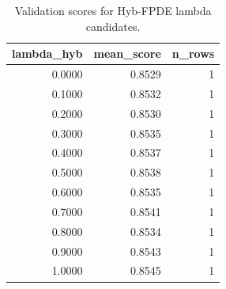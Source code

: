 \begin{table}[t]
\caption{Validation scores for Hyb-FPDE lambda candidates.}
\label{tab:lambda_distribution_computed}
\centering
\begin{tabular}{rrr}
\toprule
lambda\_hyb & mean\_score & n\_rows \\
\midrule
0.0000 & 0.8529 & 1 \\
0.1000 & 0.8532 & 1 \\
0.2000 & 0.8530 & 1 \\
0.3000 & 0.8535 & 1 \\
0.4000 & 0.8537 & 1 \\
0.5000 & 0.8538 & 1 \\
0.6000 & 0.8535 & 1 \\
0.7000 & 0.8541 & 1 \\
0.8000 & 0.8534 & 1 \\
0.9000 & 0.8543 & 1 \\
1.0000 & 0.8545 & 1 \\
\bottomrule
\end{tabular}

\end{table}
